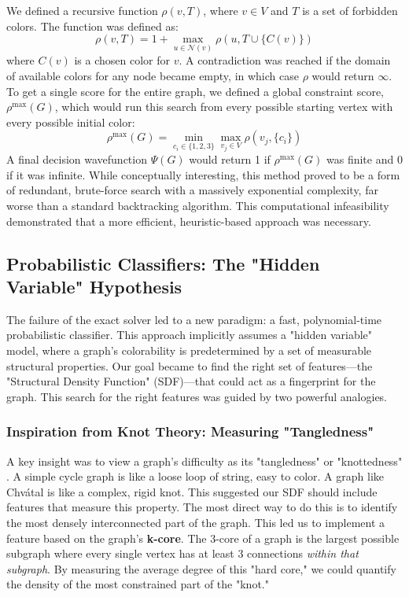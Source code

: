 \documentclass[12pt, letterpaper]{article}
\begin{document}
We defined a recursive function $\rho(v, T)$, where $v \in V$ and $T$ is a set of forbidden colors. The function was defined as:
$$ \rho(v, T) = 1 + \max_{u \in \mathcal{N}(v)} \rho(u, T \cup \{C(v)\}) $$
where $C(v)$ is a chosen color for $v$. A contradiction was reached if the domain of available colors for any node became empty, in which case $\rho$ would return $\infty$. To get a single score for the entire graph, we defined a global constraint score, $\rho^{\text{max}}(G)$, which would run this search from every possible starting vertex with every possible initial color:
$$ \rho^{\text{max}}(G) = \min_{c_i \in \{1,2,3\}} \max_{v_j \in V} \rho(v_j, \{c_i\}) $$
A final decision wavefunction $\Psi(G)$ would return 1 if $\rho^{\text{max}}(G)$ was finite and 0 if it was infinite. While conceptually interesting, this method proved to be a form of redundant, brute-force search with a massively exponential complexity, far worse than a standard backtracking algorithm. This computational infeasibility demonstrated that a more efficient, heuristic-based approach was necessary.

\subsection{Probabilistic Classifiers: The "Hidden Variable" Hypothesis}
The failure of the exact solver led to a new paradigm: a fast, polynomial-time probabilistic classifier. This approach implicitly assumes a "hidden variable" model, where a graph's colorability is predetermined by a set of measurable structural properties. Our goal became to find the right set of features---the "Structural Density Function" (SDF)---that could act as a fingerprint for the graph. This search for the right features was guided by two powerful analogies.

\subsubsection{Inspiration from Knot Theory: Measuring "Tangledness"}
A key insight was to view a graph's difficulty as its "tangledness" or "knottedness" \cite{welsh1993complexity}. A simple cycle graph is like a loose loop of string, easy to color. A graph like Chvátal is like a complex, rigid knot. This suggested our SDF should include features that measure this property. The most direct way to do this is to identify the most densely interconnected part of the graph. This led us to implement a feature based on the graph's \textbf{k-core}. The 3-core of a graph is the largest possible subgraph where every single vertex has at least 3 connections \emph{within that subgraph}. By measuring the average degree of this "hard core," we could quantify the density of the most constrained part of the "knot."
\end{document}
